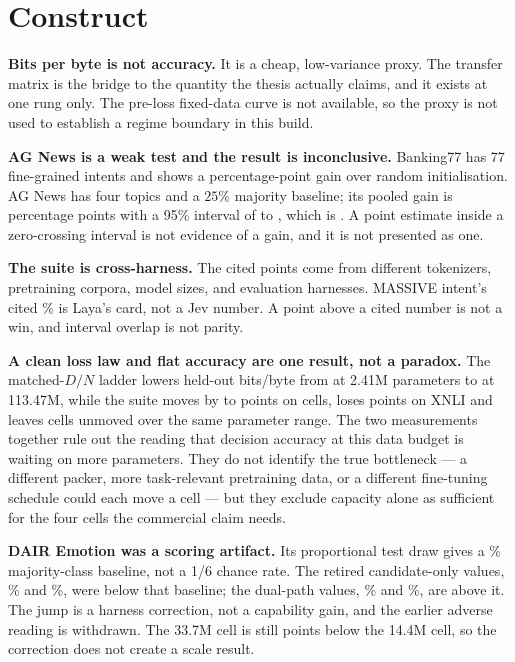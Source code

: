 \section{Construct}

\textbf{Bits per byte is not accuracy.} It is a cheap, low-variance proxy. The
transfer matrix is the bridge to the quantity the thesis actually claims, and it
exists at one rung only. The pre-loss fixed-data curve is not available, so the
proxy is not used to establish a regime boundary in this build.

\textbf{AG News is a weak test and the result is inconclusive.} Banking77 has 77
fine-grained intents and shows a \TransferBankGain{} percentage-point gain over
random initialisation. AG News has four topics and a $25\%$ majority baseline; its
pooled gain is \TransferAgGain{} percentage points with a 95\% interval of
\TransferAgLo{} to \TransferAgHi{}, which is \TransferAgVerdict. A point estimate
inside a zero-crossing interval is not evidence of a gain, and it is not presented
as one.

\textbf{The suite is cross-harness.} The cited points come from different
tokenizers, pretraining corpora, model sizes, and evaluation harnesses. MASSIVE
intent's cited \SuiteCitedMassiveIntent\% is Laya's card, not a Jev number. A
point above a cited number is not a win, and interval overlap is not parity.

\textbf{A clean loss law and flat accuracy are one result, not a paradox.} The
matched-$D/N$ ladder lowers held-out bits/byte from \IsoTinyExh{} at 2.41M
parameters to \IsoLargeBpb{} at 113.47M, while the suite moves by
\SuiteLargeWinMin{} to \SuiteLargeWinMax{} points on \SuiteLargeWins{} cells,
loses \SuiteLargeLossAbs{} points on XNLI and leaves \SuiteLargeUnmoved{} cells
unmoved over
the same parameter range. The two measurements together rule out the reading
that decision accuracy at this data budget is waiting on more parameters. They
do not identify the true bottleneck --- a different packer, more task-relevant
pretraining data, or a different fine-tuning schedule could each move a cell ---
but they exclude capacity alone as sufficient for the four cells the commercial
claim needs.


\textbf{DAIR Emotion was a scoring artifact.} Its proportional test draw gives a
\SuiteEmotionMajority\% majority-class baseline, not a 1/6 chance rate. The
retired candidate-only values, \SuiteSmallPriorEmotion\% and
\SuiteMidPriorEmotion\%, were below that baseline; the dual-path values,
\SuiteSmallEmotion\% and \SuiteMidEmotion\%, are above it. The jump is a harness
correction, not a capability gain, and the earlier adverse reading is withdrawn.
The 33.7M cell is still \SuiteEmotionRungDrop{} points below the 14.4M cell, so
the correction does not create a scale result.

